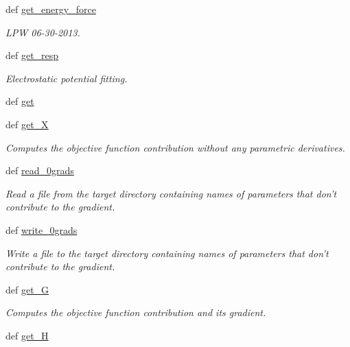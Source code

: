 \begin{DoxyCompactItemize}
def \hyperlink{classforcebalance_1_1abinitio_1_1AbInitio_ace85b4ad9266a96d16e39a4c6b440b7f}{get\-\_\-energy\-\_\-force}
\begin{DoxyCompactList}\small\item\em L\-P\-W 06-\/30-\/2013. \end{DoxyCompactList}\item 
def \hyperlink{classforcebalance_1_1abinitio_1_1AbInitio_a2e7f4452fb37b5e7eced48d8276741f5}{get\-\_\-resp}
\begin{DoxyCompactList}\small\item\em Electrostatic potential fitting. \end{DoxyCompactList}\item 
def \hyperlink{classforcebalance_1_1abinitio_1_1AbInitio_a2bb3ed7209707f688ec8b731392466b5}{get}
\item 
def \hyperlink{classforcebalance_1_1target_1_1Target_a606dd136f195c267c05a2455405e5949}{get\-\_\-\-X}
\begin{DoxyCompactList}\small\item\em Computes the objective function contribution without any parametric derivatives. \end{DoxyCompactList}\item 
def \hyperlink{classforcebalance_1_1target_1_1Target_a09bb0e8350a17974c908a9728b2709bf}{read\-\_\-0grads}
\begin{DoxyCompactList}\small\item\em Read a file from the target directory containing names of parameters that don't contribute to the gradient. \end{DoxyCompactList}\item 
def \hyperlink{classforcebalance_1_1target_1_1Target_acc7601caa4b719bf7e31961c2eb30dd7}{write\-\_\-0grads}
\begin{DoxyCompactList}\small\item\em Write a file to the target directory containing names of parameters that don't contribute to the gradient. \end{DoxyCompactList}\item 
def \hyperlink{classforcebalance_1_1target_1_1Target_afa8cc38c8bba8861c072e789717aa049}{get\-\_\-\-G}
\begin{DoxyCompactList}\small\item\em Computes the objective function contribution and its gradient. \end{DoxyCompactList}\item 
def \hyperlink{classforcebalance_1_1target_1_1Target_a1d2ee27fe86a09769c1816af23b09adb}{get\-\_\-\-H}

\end{DoxyCompactItemize}
